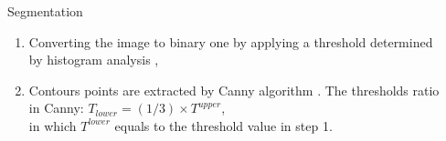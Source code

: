 \documentclass{LaBRI_poster}
\begin{document}
\begin{frame}[t]
\begin{columns}[t]
  		
	



\begin{column}{\sepwidth}\end{column} %

\end{columns}


\begin{columns}[t]

\begin{column}{\sepwidth}\end{column} %


\begin{column}{\twocolwidth}

\begin{block}{Segmentation}
	
	\begin{enumerate}[\hspace{25pt}1.]
		\item Converting the image to binary one by applying a threshold determined by histogram analysis \cite{beurton2017maelab},
		\item Contours points are extracted by Canny algorithm \cite{canny1986computational}. The thresholds ratio in Canny: $T_{lower} = (1/3) \times T^{upper}$,\\ in which $T^{lower}$ equals to the threshold value in step 1.
	\end{enumerate}
	
\end{block}




\end{column}
\end{columns}
\end{frame}
\end{document}
